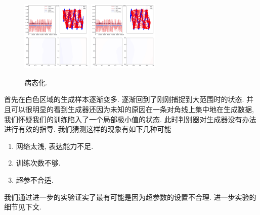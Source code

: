 \documentclass[lang=cn,11pt]{elegantpaper}
\begin{document}
\begin{figure}[htbp]
  \includegraphics[width=0.3\textwidth]{sin_4_5}
  \includegraphics[width=0.3\textwidth]{sin_4_6}
  \caption{病态化. \label{fig:f2}}
\end{figure}

首先在白色区域的生成样本逐渐变多. 逐渐回到了刚刚捕捉到大范围时的状态. 并且可以很明显的看到生成器还因为未知的原因在一条对角线上集中地在生成数据, 我们怀疑我们的训练陷入了一个局部极小值的状态. 此时判别器对生成器没有办法进行有效的指导. 我们猜测这样的现象有如下几种可能

\begin{enumerate}
	\item 网络太浅, 表达能力不足.
	\item 训练次数不够.
	\item 超参不合适.
\end{enumerate}

\noindent 我们通过进一步的实验证实了最有可能是因为超参数的设置不合理. 进一步实验的细节见下文. 
\end{document}
